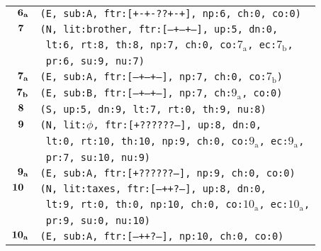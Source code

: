 \documentclass{article}
\begin{document}
\begin{minipage}{\textwidth}
{\begin{tabular}{|r|l|}
    ${\textbf{\textrm{6}}_{\textbf{\textrm{a}}}}$ & \texttt{\texttt{(E,~sub:A,~ftr:[+-+-??+-+],~np:6,~ch:0,~co:0)}} \\
    ${\textbf{\textrm{7}}_{\phantom{z}}}$ & \texttt{\texttt{(N,~lit:brother,~ftr:[---+--+--],~up:5,~dn:0,}} \\
    & \texttt{\texttt{~lt:6,~rt:8,~th:8,~np:7,~ch:0,~co:${\textrm{7}_{\textrm{a}}}$,~ec:${\textrm{7}_{\textrm{b}}}$,}} \\
    & \texttt{\texttt{~pr:6,~su:9,~nu:7)}} \\
    ${\textbf{\textrm{7}}_{\textbf{\textrm{a}}}}$ & \texttt{\texttt{(E,~sub:A,~ftr:[---+--+--],~np:7,~ch:0,~co:${\textrm{7}_{\textrm{b}}}$)}} \\
    ${\textbf{\textrm{7}}_{\textbf{\textrm{b}}}}$ & \texttt{\texttt{(E,~sub:B,~ftr:[---+--+--],~np:7,~ch:${\textrm{9}_{\textrm{a}}}$,~co:0)}} \\
    ${\textbf{\textrm{8}}_{\phantom{z}}}$ & \texttt{\texttt{(S,~up:5,~dn:9,~lt:7,~rt:0,~th:9,~nu:8)}} \\
    ${\textbf{\textrm{9}}_{\phantom{z}}}$ & \texttt{\texttt{(N,~lit:$\phi$,~ftr:[+??????--],~up:8,~dn:0,}} \\
    & \texttt{\texttt{~lt:0,~rt:10,~th:10,~np:9,~ch:0,~co:${\textrm{9}_{\textrm{a}}}$,~ec:${\textrm{9}_{\textrm{a}}}$,}} \\
    & \texttt{\texttt{~pr:7,~su:10,~nu:9)}} \\
    ${\textbf{\textrm{9}}_{\textbf{\textrm{a}}}}$ & \texttt{\texttt{(E,~sub:A,~ftr:[+??????--],~np:9,~ch:0,~co:0)}} \\
    ${\textbf{\textrm{10}}_{\phantom{z}}}$ & \texttt{\texttt{(N,~lit:taxes,~ftr:[---++?---],~up:8,~dn:0,}} \\
    & \texttt{\texttt{~lt:9,~rt:0,~th:0,~np:10,~ch:0,~co:${\textrm{10}_{\textrm{a}}}$,~ec:${\textrm{10}_{\textrm{a}}}$,}} \\
    & \texttt{\texttt{~pr:9,~su:0,~nu:10)}} \\
    ${\textbf{\textrm{10}}_{\textbf{\textrm{a}}}}$ & \texttt{\texttt{(E,~sub:A,~ftr:[---++?---],~np:10,~ch:0,~co:0)}} \\
    \hline
  \end{tabular}
  }
\end{minipage}
\bigbreak
\end{document}
